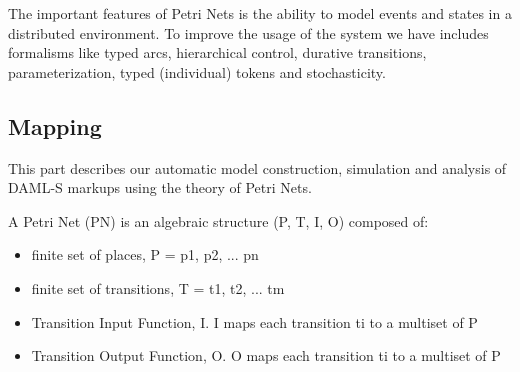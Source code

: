 The important features of Petri Nets is the ability to model events and states in a distributed environment. To improve the usage of the system we have includes formalisms like typed arcs, hierarchical control, durative transitions, parameterization, typed (individual) tokens and stochasticity.

\subsection*{Mapping}
This part describes our automatic model construction, simulation and analysis of DAML-S markups using the theory of Petri Nets.

\textbf{} A Petri Net (PN) is an algebraic structure (P, T, I, O) composed of:
\begin{itemize}
\item finite set of places, P = {p1, p2, ... pn}
\item finite set of transitions, T = {t1, t2, ... tm}
\item Transition Input Function, I. I maps each transition ti to
a multiset of P
\item Transition Output Function, O. O maps each transition ti
to a multiset of P
\end{itemize}

